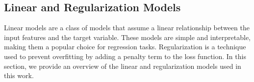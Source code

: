 \subsection{Linear and Regularization Models}
Linear models are a class of models that assume a linear relationship between the input features and the target variable.
These models are simple and interpretable, making them a popular choice for regression tasks.
Regularization is a technique used to prevent overfitting by adding a penalty term to the loss function.
In this section, we provide an overview of the linear and regularization models used in this work.




